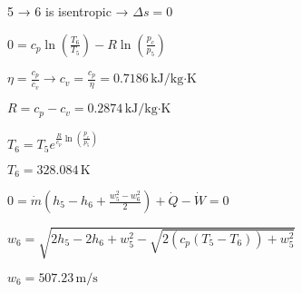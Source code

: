 5 → 6 is isentropic → \( \Delta s = 0 \)  

\( 0 = c_p \ln \left( \frac{T_6}{T_5} \right) - R \ln \left( \frac{p_c}{p_5} \right) \)  

\( \eta = \frac{c_p}{c_v} \rightarrow c_v = \frac{c_p}{\eta} = 0.7186 \, \text{kJ/kg·K} \)  

\( R = c_p - c_v = 0.2874 \, \text{kJ/kg·K} \)  

\( T_6 = T_5 e^{\frac{R}{c_p} \ln \left( \frac{p_c}{p_5} \right)} \)  

\( T_6 = 328.084 \, \text{K} \)  

\( 0 = \dot{m} \left( h_5 - h_6 + \frac{w_5^2 - w_6^2}{2} \right) + \dot{Q} - \dot{W} = 0 \)  

\( w_6 = \sqrt{2 h_5 - 2 h_6 + w_5^2 - \sqrt{2 \left( c_p \left( T_5 - T_6 \right) \right) + w_5^2}} \)  

\( w_6 = 507.23 \, \text{m/s} \)